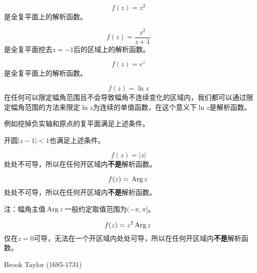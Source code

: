 \documentclass[CJK]{beamer}
\begin{document}
\begin{frame}
  \bch
  \bex
  $$f(z) = z^2$$
  是全复平面上的解析函数。
  \eex
  \ech
\end{frame}

\begin{frame}
  \bch
  \bex
  $$f(z) = \frac{z^2}{z+1}$$
  是全复平面挖去$z=-1$后的区域上的解析函数。
  \eex
  \ech
\end{frame}

\begin{frame}
  \bch
  \bex
  $$f(z) = e^z$$
  是全复平面上的解析函数。
  \eex
  \ech
\end{frame}


\begin{frame}
  \bch
  \bex
  $$f(z) = \ln z$$
  在任何可以限定幅角范围且不会导致幅角不连续变化的区域内，我们都可以通过限定幅角范围的方法来限定$\ln z$为连续的单值函数，在这个意义下$\ln z$是解析函数。

  \skiplines
  
  例如挖掉负实轴和原点的复平面满足上述条件。

  开圆$|z-1|<1$也满足上述条件。

  \eex
  \ech
\end{frame}


\begin{frame}
  \bch
  \bex
  $$f(z) = |z|$$
  处处不可导，所以在任何开区域内{\bf 不是}解析函数。
  \eex
  \ech
\end{frame}


\begin{frame}
  \bch
  \bex
  $$f(z) = \,\mathrm{Arg}\,z\,$$
  处处不可导，所以在任何开区域内{\bf 不是}解析函数。
  \eex

  \skiplines

{\scriptsize  注：幅角主值$\,\mathrm{Arg}\,z\,$一般约定取值范围为$(-\pi,\pi]$。}
  \ech
\end{frame}

\begin{frame}
  \bch
  \bex
  $$f(z) = z^2 \,\mathrm{Arg}\,z\,$$
  仅在$z=0$可导，无法在一个开区域内处处可导，所以在任何开区域内{\bf 不是}解析函数。
  \eex
  \ech
\end{frame}


\begin{frame}
  \bch
  \bcenter

  Brook Taylor (1685-1731)
  \ecenter
  \ech
\end{frame}
\end{document}
